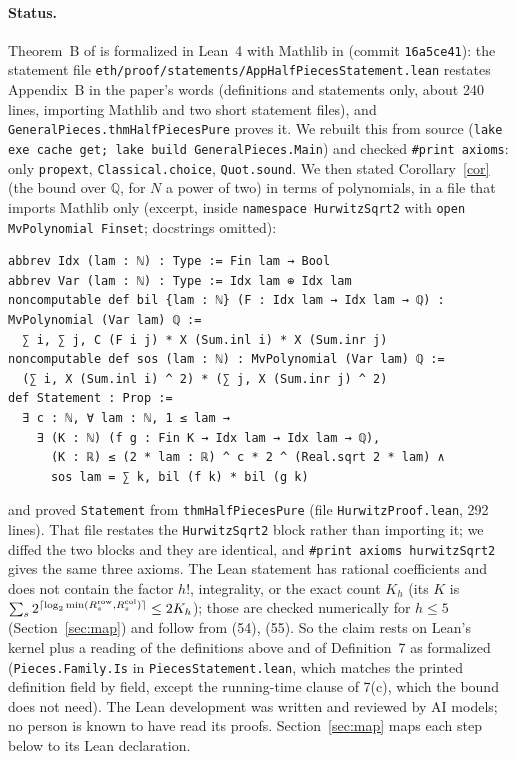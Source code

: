 \documentclass[11pt]{amsart}
\theoremstyle{remark}
\newcommand{\Q}{\mathbb{Q}}
\begin{document}
\paragraph{Status.} Theorem~B of \cite{ETH} is formalized in Lean~4 with Mathlib in \cite{FM} (commit
\texttt{16a5ce41}): the statement file \texttt{eth/proof/statements/AppHalfPiecesStatement.lean} restates Appendix~B
in the paper's words (definitions and statements only, about 240 lines, importing Mathlib and two short statement
files), and \texttt{GeneralPieces.thmHalfPiecesPure} proves it. We rebuilt this from source
(\texttt{lake exe cache get; lake build GeneralPieces.Main}) and checked
\texttt{\#print axioms}: only \texttt{propext}, \texttt{Classical.choice}, \texttt{Quot.sound}. We then stated
Corollary~\ref{cor} (the bound over $\Q$, for $N$ a power of two) in terms of polynomials, in a file that imports Mathlib only
(excerpt, inside \texttt{namespace HurwitzSqrt2} with \texttt{open MvPolynomial Finset}; docstrings omitted):
{\footnotesize
\begin{verbatim}
abbrev Idx (lam : ℕ) : Type := Fin lam → Bool
abbrev Var (lam : ℕ) : Type := Idx lam ⊕ Idx lam
noncomputable def bil {lam : ℕ} (F : Idx lam → Idx lam → ℚ) : MvPolynomial (Var lam) ℚ :=
  ∑ i, ∑ j, C (F i j) * X (Sum.inl i) * X (Sum.inr j)
noncomputable def sos (lam : ℕ) : MvPolynomial (Var lam) ℚ :=
  (∑ i, X (Sum.inl i) ^ 2) * (∑ j, X (Sum.inr j) ^ 2)
def Statement : Prop :=
  ∃ c : ℕ, ∀ lam : ℕ, 1 ≤ lam →
    ∃ (K : ℕ) (f g : Fin K → Idx lam → Idx lam → ℚ),
      (K : ℝ) ≤ (2 * lam : ℝ) ^ c * 2 ^ (Real.sqrt 2 * lam) ∧
      sos lam = ∑ k, bil (f k) * bil (g k)
\end{verbatim}
}
and proved \texttt{Statement} from \texttt{thmHalfPiecesPure} (file \texttt{HurwitzProof.lean}, 292 lines). That file
restates the \texttt{HurwitzSqrt2} block rather than importing it; we diffed the two blocks and they are identical, and
\texttt{\#print axioms hurwitzSqrt2} gives the same three axioms. The Lean statement has rational coefficients and does
not contain the factor $h!$, integrality, or the exact count $K_h$ (its $K$ is
$\sum_s2^{\lceil\log_2\min(R^{\rm row}_s,R^{\rm col}_s)\rceil}\le2K_h$); those are checked numerically for $h\le5$
(Section~\ref{sec:map}) and follow from (54), (55).
So the claim rests on Lean's kernel plus a reading of the definitions above and of Definition~7 as formalized
(\texttt{Pieces.Family.Is} in \texttt{PiecesStatement.lean}, which matches the printed definition field by field,
except the running-time clause of 7(c), which the bound does not need).
The Lean development was written and reviewed by AI models; no person is known to have read its proofs.
Section~\ref{sec:map} maps each step below to its Lean declaration.
\end{document}
